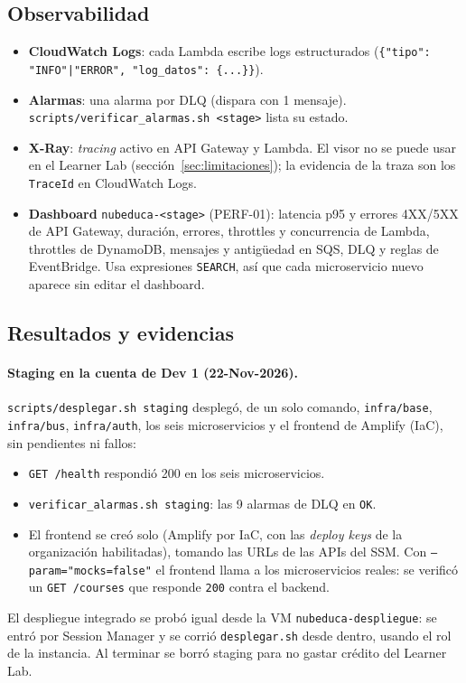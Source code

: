 \subsection{Observabilidad}
\begin{itemize}
  \item \textbf{CloudWatch Logs}: cada Lambda escribe logs estructurados
        (\texttt{\{"tipo": "INFO"|"ERROR", "log\_datos": \{...\}\}}).
  \item \textbf{Alarmas}: una alarma por DLQ (dispara con 1 mensaje). \texttt{scripts/verificar\_alarmas.sh
        <stage>} lista su estado.
  \item \textbf{X-Ray}: \textit{tracing} activo en API Gateway y Lambda. El visor no se puede usar en el
        Learner Lab (sección~\ref{sec:limitaciones}); la evidencia de la traza son los \texttt{TraceId}
        en CloudWatch Logs.
  \item \textbf{Dashboard} \texttt{nubeduca-<stage>} (PERF-01): latencia p95 y errores 4XX/5XX de API
        Gateway, duración, errores, throttles y concurrencia de Lambda, throttles de DynamoDB, mensajes y
        antigüedad en SQS, DLQ y reglas de EventBridge. Usa expresiones \texttt{SEARCH}, así que cada
        microservicio nuevo aparece sin editar el dashboard.
\end{itemize}

\subsection{Resultados y evidencias}
\paragraph{Staging en la cuenta de Dev 1 (22-Nov-2026).}
\texttt{scripts/desplegar.sh staging} desplegó, de un solo comando, \texttt{infra/base},
\texttt{infra/bus}, \texttt{infra/auth}, los seis microservicios y el frontend de Amplify (IaC), sin
pendientes ni fallos:
\begin{itemize}
  \item \texttt{GET /health} respondió 200 en los seis microservicios.
  \item \texttt{verificar\_alarmas.sh staging}: las 9 alarmas de DLQ en \texttt{OK}.
  \item El frontend se creó solo (Amplify por IaC, con las \textit{deploy keys} de la organización
        habilitadas), tomando las URLs de las APIs del SSM. Con \texttt{--param="mocks=false"} el
        frontend llama a los microservicios reales: se verificó un \texttt{GET /courses} que responde
        \texttt{200} contra el backend.
\end{itemize}
El despliegue integrado se probó igual desde la VM \texttt{nubeduca-despliegue}: se entró por Session
Manager y se corrió \texttt{desplegar.sh} desde dentro, usando el rol de la instancia. Al terminar se
borró staging para no gastar crédito del Learner Lab.

